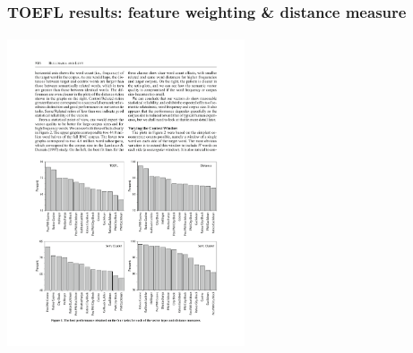 \documentclass[t]{beamer} %
\begin{document}
\begin{frame}
  \frametitle{TOEFL results: feature weighting \& distance measure}
  \framesubtitle{\citep[p.~516, Fig.~1]{Bullinaria:Levy:07}}

  \ungap[1.5]
  \begin{center}
    \includegraphics[width=7cm]{img/BullinariaLevy2007_p516_fig1_TOEFL_metric}
  \end{center}

  \ungap[1]
\end{frame}
\end{document}
